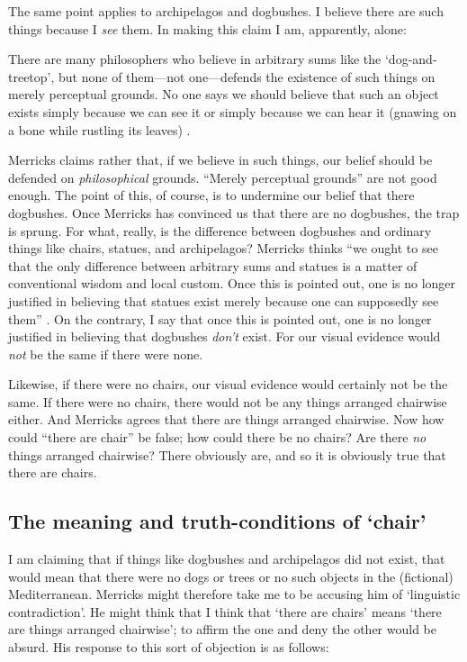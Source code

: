 \documentclass[11pt]{article}
\newenvironment{squote}{%
\begin{spacing}{1}
       	\begin{list}{}{%
\setlength{\labelwidth}{0pt}%
\rightmargin\leftmargin%
}
\item\relax
}{%
\end{list}%
\end{spacing}
}
\begin{document}
\begin{spacing}{1.25}
The same point applies to archipelagos and dogbushes.  I believe there
are such things because I {\em see} them.  In making this claim I am,
apparently, alone:

\begin{squote}
There are many philosophers who believe in arbitrary sums like the
`dog-and-treetop', but none of them---not one---defends the existence
of such things on merely perceptual grounds. No one says we should
believe that such an object exists simply because we can see it or
simply because we can hear it (gnawing on a bone while rustling its
leaves) \citep[74]{merricks2001a}.
\end{squote}

Merricks claims rather that, if we believe in such things, our belief
should be defended on {\em philosophical} grounds.  ``Merely
perceptual grounds'' are not good enough.  The point of this, of
course, is to undermine our belief that there dogbushes.  Once
Merricks has convinced us that there are no dogbushes, the trap is
sprung.  For what, really, is the difference between dogbushes and
ordinary things like chairs, statues, and archipelagos?  Merricks
thinks ``we ought to see that the only difference between arbitrary
sums and statues is a matter of conventional wisdom and local custom.
Once this is pointed out, one is no longer justified in believing that
statues exist merely because one can supposedly see them''
\citeyearpar[75]{merricks2001a}.  On the contrary, I say that once
this is pointed out, one is no longer justified in believing that
dogbushes {\em don't} exist.  For our visual evidence would {\em not}
be the same if there were none.

Likewise, if there were no chairs, our visual evidence would certainly
not be the same.  If there were no chairs, there would not be any
things arranged chairwise either.  And Merricks agrees that there are
things arranged chairwise.  Now how could ``there are chair'' be
false; how could there be no chairs?  Are there {\em no} things
arranged chairwise?  There obviously are, and so it is obviously true
that there are chairs.

\subsection{The meaning and truth-conditions of `chair'}
\label{meaning}
I am claiming that if things like dogbushes and archipelagos did not
exist, that would mean that there were no dogs or trees or no such
objects in the (fictional) Mediterranean.  Merricks might therefore
take me to be accusing him of `linguistic contradiction'.  He might
think that I think that `there are chairs' means `there are things
arranged chairwise'; to affirm the one and deny the other would be
absurd.  His response to this sort of objection is as follows:


\end{spacing}
\end{document}
